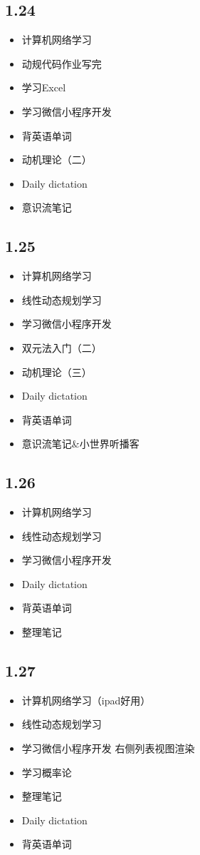 \documentclass[UTF8]{ctexart}
\begin{document}
\subsection*{1.24}
\begin{itemize}
    \item 计算机网络学习
    \item 动规代码作业写完
    \item 学习Excel
    \item 学习微信小程序开发
    \item 背英语单词
    \item 动机理论（二）
    \item Daily dictation
    \item 意识流笔记
\end{itemize}
\subsection*{1.25}
\begin{itemize}
    \item 计算机网络学习
    \item 线性动态规划学习
    \item 学习微信小程序开发
    \item 双元法入门（二）
    \item 动机理论（三）
    \item Daily dictation
    \item 背英语单词
    \item 意识流笔记\&小世界听播客
\end{itemize}
\subsection*{1.26}
\begin{itemize}
    \item 计算机网络学习
    \item 线性动态规划学习
    \item 学习微信小程序开发
    \item Daily dictation
    \item 背英语单词
    \item 整理笔记
\end{itemize}
\subsection*{1.27}
\begin{itemize}
    \item 计算机网络学习（ipad好用）
    \item 线性动态规划学习
    \item 学习微信小程序开发 右侧列表视图渲染
    \item 学习概率论
    \item 整理笔记
    \item Daily dictation
    \item 背英语单词
\end{itemize}
\end{document}
